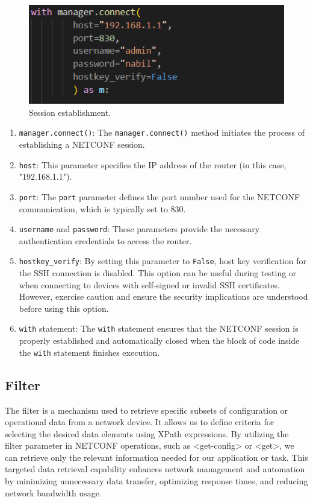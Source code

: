 \begin{figure}[h]
    \centering
    \includegraphics[width=0.5\linewidth]{Images/m_connect.png}
    \caption{Session establishment.}
\end{figure}

\begin{enumerate}
    \item \texttt{manager.connect()}: The \texttt{manager.connect()} method initiates the process of establishing a NETCONF session.
    \item \texttt{host}: This parameter specifies the IP address of the router (in this case, "192.168.1.1").
    \item \texttt{port}: The \texttt{port} parameter defines the port number used for the NETCONF communication, which is typically set to 830.
    \item \texttt{username} and \texttt{password}: These parameters provide the necessary authentication credentials to access the router.
    \item \texttt{hostkey\_verify}: By setting this parameter to \texttt{False}, host key verification for the SSH connection is disabled. This option can be useful during testing or when connecting to devices with self-signed or invalid SSH certificates. However, exercise caution and ensure the security implications are understood before using this option.
    \item \texttt{with} statement: The \texttt{with} statement ensures that the NETCONF session is properly established and automatically closed when the block of code inside the \texttt{with} statement finishes execution.
\end{enumerate}
\subsection{Filter}
The filter is a mechanism used to retrieve specific subsets of configuration or operational data from a network device. It allows us to define criteria for selecting the desired data elements using XPath expressions. By utilizing the filter parameter in NETCONF operations, such as <get-config> or <get>, we can retrieve only the relevant information needed for our application or task. This targeted data retrieval capability enhances network management and automation by minimizing unnecessary data transfer, optimizing response times, and reducing network bandwidth usage. 

